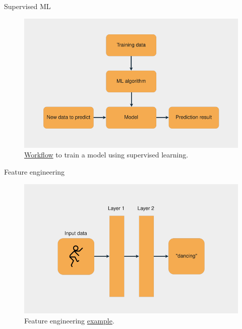 \documentclass{beamer}
\begin{document}
\begin{frame}{Supervised ML}
    \begin{figure}
        \includegraphics[width=0.9\linewidth]{ML}
        \caption{\href{https://realpython.com/python-ai-neural-network/}{Workflow} to train a model using supervised learning.}
        \label{Fig:ML}
    \end{figure}
\end{frame}

\begin{frame}{Feature engineering}
    \begin{figure}
        \includegraphics[width=0.9\linewidth]{FeatureEngineering}
        \caption{Feature engineering \href{https://realpython.com/python-ai-neural-network/}{example}.}
        \label{Fig:FeatureEngineering}
    \end{figure}
\end{frame}
\end{document}

